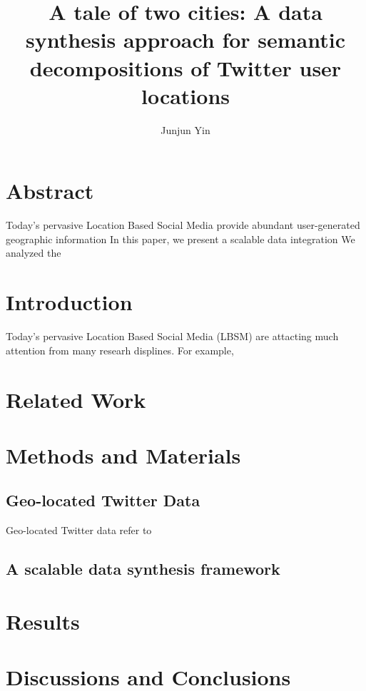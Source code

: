 \documentclass[a4paper,11pt]{article}
\begin{document}
\title{A tale of two cities: A data synthesis approach for semantic decompositions of Twitter user locations}
\author[1~\thanks{yinjunjun@gmail.com}]{Junjun Yin}
\renewcommand\Authands{ and }
\maketitle

\section*{Abstract}

Today's pervasive Location Based Social Media provide abundant user-generated geographic information
In this paper, we present a scalable data integration 
We analyzed the 



\section{Introduction}
Today's pervasive Location Based Social Media (LBSM) are attacting much attention from many researh displines. For example,  



\section{Related Work}



\section{Methods and Materials}
\subsection{Geo-located Twitter Data}
Geo-located Twitter data refer to  


\subsection{A scalable data synthesis framework}



\section{Results}


\section{Discussions and Conclusions}
\end{document}
